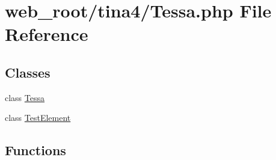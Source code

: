 \hypertarget{Tessa_8php}{}\section{web\+\_\+root/tina4/\+Tessa.php File Reference}
\label{Tessa_8php}
\subsection*{Classes}
\begin{DoxyCompactItemize}
\item 
class \hyperlink{classTessa}{Tessa}
\item 
class \hyperlink{classTestElement}{Test\+Element}
\end{DoxyCompactItemize}
\subsection*{Functions}
